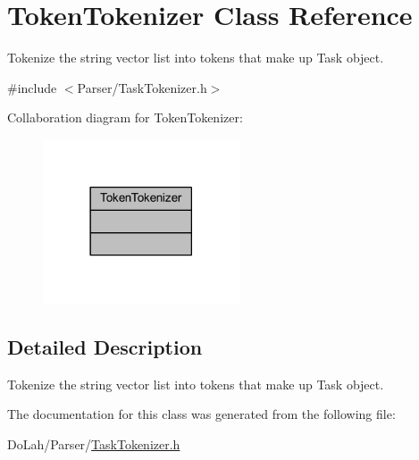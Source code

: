 \hypertarget{class_token_tokenizer}{}\section{Token\+Tokenizer Class Reference}
\label{class_token_tokenizer}


Tokenize the string vector list into tokens that make up Task object.  




{\ttfamily \#include $<$Parser/\+Task\+Tokenizer.\+h$>$}



Collaboration diagram for Token\+Tokenizer\+:
\nopagebreak
\begin{figure}[H]
\begin{center}
\leavevmode
\includegraphics[width=165pt]{class_token_tokenizer__coll__graph}
\end{center}
\end{figure}


\subsection{Detailed Description}
Tokenize the string vector list into tokens that make up Task object. 

The documentation for this class was generated from the following file\+:\begin{DoxyCompactItemize}
\item 
Do\+Lah/\+Parser/\hyperlink{_task_tokenizer_8h}{Task\+Tokenizer.\+h}\end{DoxyCompactItemize}
